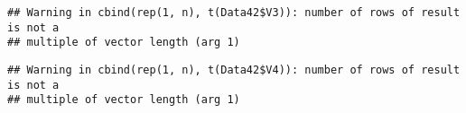\documentclass[
]{article}
\newenvironment{Shaded}{\begin{snugshade}}{\end{snugshade}}
\newcommand{\DecValTok}[1]{\textcolor[rgb]{0.00,0.00,0.81}{#1}}
\newcommand{\FunctionTok}[1]{\textcolor[rgb]{0.00,0.00,0.00}{#1}}
\newcommand{\NormalTok}[1]{#1}
\newcommand{\OtherTok}[1]{\textcolor[rgb]{0.56,0.35,0.01}{#1}}
\newcommand{\SpecialCharTok}[1]{\textcolor[rgb]{0.00,0.00,0.00}{#1}}
\begin{document}
\begin{verbatim}
## Warning in cbind(rep(1, n), t(Data42$V3)): number of rows of result is not a
## multiple of vector length (arg 1)
\end{verbatim}

\begin{Shaded}
\end{Shaded}

\begin{verbatim}
## Warning in cbind(rep(1, n), t(Data42$V4)): number of rows of result is not a
## multiple of vector length (arg 1)
\end{verbatim}
\end{document}
